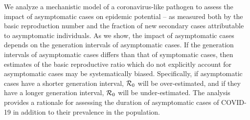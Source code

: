 {\footnotesize We analyze a mechanistic model of a coronavirus-like pathogen
to assess the impact of asymptomatic cases on epidemic potential
-- as measured both by the basic reproduction
number and the fraction of new secondary cases attributable to asymptomatic
individuals. As we show, the impact of asymptomatic
cases depends on the generation intervals of asymptomatic cases.  
If the generation intervals of asymptomatic cases differs than that 
of symptomatic cases, then estimates of the basic reproductive ratio which do not explicitly account for asymptomatic cases may be systematically biased. Specifically, if asymptomatic cases have a shorter generation interval, 
${\cal{R}}_0$ will be over-estimated, and if they have a longer generation interval, ${\cal{R}}_0$ will be under-estimated.
The analysis provides a rationale for assessing the duration of asymptomatic cases 
of COVID-19 in addition to their prevalence in the population.
}

